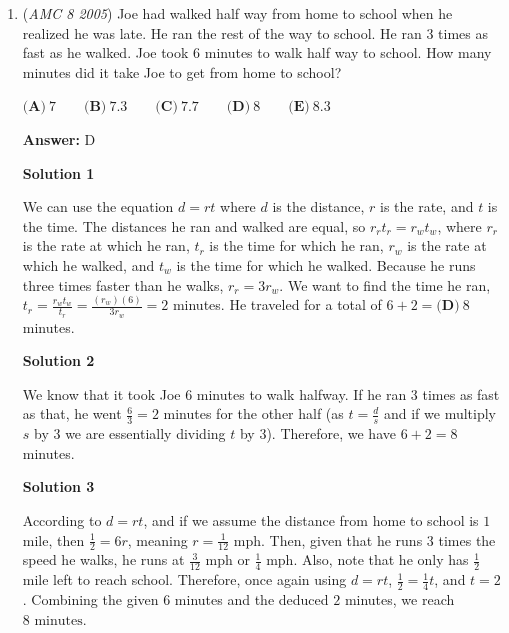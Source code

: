 \begin{enumerate}
 



\textbf{Solution 3 (Easiest)}

Take an equilateral triangle with side length $17$. $\triangle ADC$ is congruent to this by $SAS$, hence it is equilateral. The answer is $\boxed{\textbf{(D)}17}$.

 


	\item (\textit{AMC 8 2005}) Joe had walked half way from home to school when he realized he was late. He ran the rest of the way to school. He ran 3 times as fast as he walked. Joe took 6 minutes to walk half way to school. How many minutes did it take Joe to get from home to school?


 $\textbf{(A)}\ 7\qquad\textbf{(B)}\ 7.3\qquad\textbf{(C)}\ 7.7\qquad\textbf{(D)}\ 8\qquad\textbf{(E)}\ 8.3$

 \textbf{Answer: }D



\textbf{Solution 1}

We can use the equation $d=rt$ where $d$ is the distance, $r$ is the rate, and $t$ is the time. The distances he ran and walked are equal, so $r_rt_r=r_wt_w$, where $r_r$ is the rate at which he ran, $t_r$ is the time for which he ran, $r_w$ is the rate at which he walked, and $t_w$ is the time for which he walked. Because he runs three times faster than he walks, $r_r=3r_w$. We want to find the time he ran, $t_r = \frac{r_wt_w}{t_r} = \frac{(r_w)(6)}{3r_w} = 2$ minutes. He traveled for a total of $6+2=\boxed{\textbf{(D)}\ 8}$ minutes.

 



\textbf{Solution 2}

We know that it took Joe $6$ minutes to walk halfway. If he ran $3$ times as fast as that, he went $\frac63 = 2$ minutes for the other half (as $t=\frac{d}{s}$ and if we multiply $s$ by $3$ we are essentially dividing $t$ by $3$). Therefore, we have $6 + 2 = 8$ minutes.

 



\textbf{Solution 3}

According to $d = rt$, and if we assume the distance from home to school is $1$ mile, then $\frac{1}{2} = 6r$, meaning $r = \frac{1}{12}\text{ mph}$. Then, given that he runs $3$ times the speed he walks, he runs at $\frac{3}{12}\text{ mph}$ or $\frac{1}{4}\text{ mph}$. Also, note that he only has $\frac{1}{2}$ mile left to reach school. Therefore, once again using $d = rt$, $\frac{1}{2} = \frac{1}{4}t$, and $t = 2$. Combining the given $6$ minutes and the deduced $2$ minutes, we reach $\boxed{8\text{ minutes}}$.


\end{enumerate}
